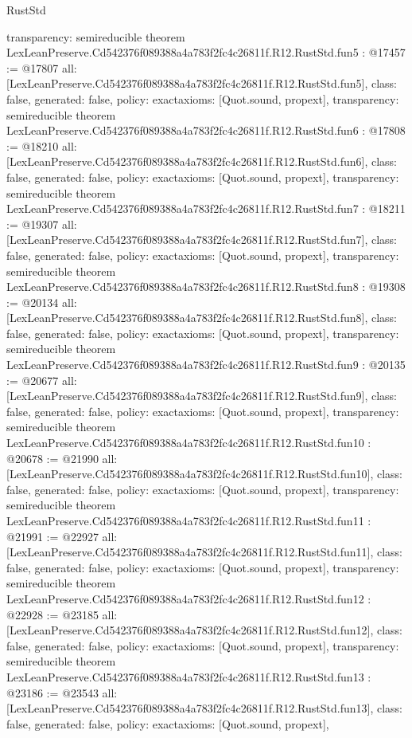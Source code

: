 \begin{lexlean}{RustStd}
\begin{coremodule}
{  transparency: semireducible
}
theorem LexLeanPreserve.Cd542376f089388a4a783f2fc4c26811f.R12.RustStd.fun5 : @17457 := @17807 {
  all: [LexLeanPreserve.Cd542376f089388a4a783f2fc4c26811f.R12.RustStd.fun5],
  class: false,
  generated: false,
  policy: exact{axioms: [Quot.sound, propext]},
  transparency: semireducible
}
theorem LexLeanPreserve.Cd542376f089388a4a783f2fc4c26811f.R12.RustStd.fun6 : @17808 := @18210 {
  all: [LexLeanPreserve.Cd542376f089388a4a783f2fc4c26811f.R12.RustStd.fun6],
  class: false,
  generated: false,
  policy: exact{axioms: [Quot.sound, propext]},
  transparency: semireducible
}
theorem LexLeanPreserve.Cd542376f089388a4a783f2fc4c26811f.R12.RustStd.fun7 : @18211 := @19307 {
  all: [LexLeanPreserve.Cd542376f089388a4a783f2fc4c26811f.R12.RustStd.fun7],
  class: false,
  generated: false,
  policy: exact{axioms: [Quot.sound, propext]},
  transparency: semireducible
}
theorem LexLeanPreserve.Cd542376f089388a4a783f2fc4c26811f.R12.RustStd.fun8 : @19308 := @20134 {
  all: [LexLeanPreserve.Cd542376f089388a4a783f2fc4c26811f.R12.RustStd.fun8],
  class: false,
  generated: false,
  policy: exact{axioms: [Quot.sound, propext]},
  transparency: semireducible
}
theorem LexLeanPreserve.Cd542376f089388a4a783f2fc4c26811f.R12.RustStd.fun9 : @20135 := @20677 {
  all: [LexLeanPreserve.Cd542376f089388a4a783f2fc4c26811f.R12.RustStd.fun9],
  class: false,
  generated: false,
  policy: exact{axioms: [Quot.sound, propext]},
  transparency: semireducible
}
theorem LexLeanPreserve.Cd542376f089388a4a783f2fc4c26811f.R12.RustStd.fun10 : @20678 := @21990 {
  all: [LexLeanPreserve.Cd542376f089388a4a783f2fc4c26811f.R12.RustStd.fun10],
  class: false,
  generated: false,
  policy: exact{axioms: [Quot.sound, propext]},
  transparency: semireducible
}
theorem LexLeanPreserve.Cd542376f089388a4a783f2fc4c26811f.R12.RustStd.fun11 : @21991 := @22927 {
  all: [LexLeanPreserve.Cd542376f089388a4a783f2fc4c26811f.R12.RustStd.fun11],
  class: false,
  generated: false,
  policy: exact{axioms: [Quot.sound, propext]},
  transparency: semireducible
}
theorem LexLeanPreserve.Cd542376f089388a4a783f2fc4c26811f.R12.RustStd.fun12 : @22928 := @23185 {
  all: [LexLeanPreserve.Cd542376f089388a4a783f2fc4c26811f.R12.RustStd.fun12],
  class: false,
  generated: false,
  policy: exact{axioms: [Quot.sound, propext]},
  transparency: semireducible
}
theorem LexLeanPreserve.Cd542376f089388a4a783f2fc4c26811f.R12.RustStd.fun13 : @23186 := @23543 {
  all: [LexLeanPreserve.Cd542376f089388a4a783f2fc4c26811f.R12.RustStd.fun13],
  class: false,
  generated: false,
  policy: exact{axioms: [Quot.sound, propext]},
}
\end{coremodule}
\end{lexlean}
